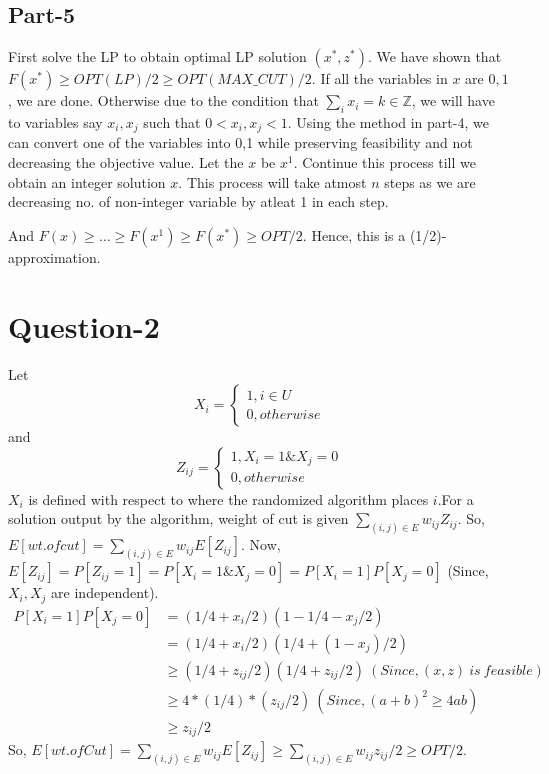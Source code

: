 \documentclass{article}
\begin{document}
\subsection{Part-5}
First solve the LP to obtain optimal LP solution $(x^*, z^*)$. We have shown that $F(x^*) \geq OPT(LP)/2 \geq OPT(MAX\_CUT)/2$. If all the variables in $x$ are $0,1$, we are done. Otherwise due to the condition that $\sum_i{x_i} = k \in \mathbb{Z}$, we will have to variables say $x_i, x_j$ such that $0 < x_i, x_j < 1$. Using the method in part-4, we can convert one of the variables into 0,1 while preserving feasibility and not decreasing the objective value. Let the $x$ be $x^1$. Continue this process till we obtain an integer solution $x$. This process will take atmost $n$ steps as we are decreasing no. of non-integer variable by atleat 1 in each step.

And
$F(x) \geq \ldots \geq F(x^1) \geq F(x^*) \geq OPT/2$. Hence, this is a (1/2)-approximation.
\section{Question-2}
Let
\begin{equation*}
    X_i = \begin{cases}1, i \in U\\ 0, otherwise\end{cases}
\end{equation*}
and
\begin{equation*}
    Z_{ij} = \begin{cases}1, X_i = 1 \& X_j = 0\\ 0, otherwise\end{cases}
\end{equation*}
$X_i$ is defined with respect to where the randomized algorithm places $i$.For a solution output by the algorithm, weight of cut is given $\sum_{(i,j) \in E}w_{ij}Z_{ij}$. So, $E[wt. of cut] = \sum_{(i,j)\in E}w_{ij}E[Z_{ij}]$. Now, $E[Z_{ij}] = P[Z_{ij} = 1] = P[X_i = 1 \& X_j = 0] = P[X_i = 1]P[X_j = 0]$ (Since, $X_i, X_j$ are independent).
\begin{align*}
    P[X_i = 1]P[X_j = 0] &= (1/4 + x_i/2)(1 - 1/4 - x_j/2)\\
    &= (1/4 + x_i/2)(1/4 + (1 - x_j)/2)\\
    &\geq (1/4 + z_{ij}/2)(1/4 + z_{ij}/2)\ (Since, (x,z)\ is\ feasible)\\
    &\geq 4*(1/4)*(z_{ij}/2)\ (Since, (a+b)^2 \geq 4ab)\\
    &\geq z_{ij}/2
\end{align*}
So, $E[wt. of Cut] = \sum_{(i,j)\in E}w_{ij}E[Z_{ij}] \geq \sum_{(i,j) \in E}w_{ij}z_{ij}/2 \geq OPT/2$. 
\end{document}
